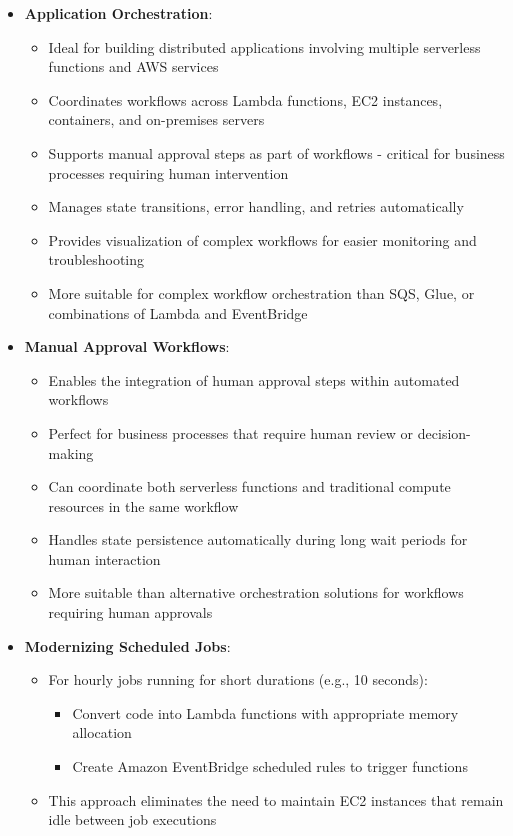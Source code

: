 \documentclass[11pt,a4paper]{report}
\begin{document}
\begin{itemize}
  \item \textbf{Application Orchestration}:
\begin{itemize}
  \item Ideal for building distributed applications involving multiple serverless functions and AWS services
  \item Coordinates workflows across Lambda functions, EC2 instances, containers, and on-premises servers
  \item Supports manual approval steps as part of workflows - critical for business processes requiring human intervention
  \item Manages state transitions, error handling, and retries automatically
  \item Provides visualization of complex workflows for easier monitoring and troubleshooting
  \item More suitable for complex workflow orchestration than SQS, Glue, or combinations of Lambda and EventBridge
\end{itemize}
  \item \textbf{Manual Approval Workflows}:
\begin{itemize}
  \item Enables the integration of human approval steps within automated workflows
  \item Perfect for business processes that require human review or decision-making
  \item Can coordinate both serverless functions and traditional compute resources in the same workflow
  \item Handles state persistence automatically during long wait periods for human interaction
  \item More suitable than alternative orchestration solutions for workflows requiring human approvals
\end{itemize}
  \item \textbf{Modernizing Scheduled Jobs}:
\begin{itemize}
  \item For hourly jobs running for short durations (e.g., 10 seconds):
\begin{itemize}
  \item Convert code into Lambda functions with appropriate memory allocation
  \item Create Amazon EventBridge scheduled rules to trigger functions
\end{itemize}
  \item This approach eliminates the need to maintain EC2 instances that remain idle between job executions

\end{itemize}
\end{itemize}
\end{document}
